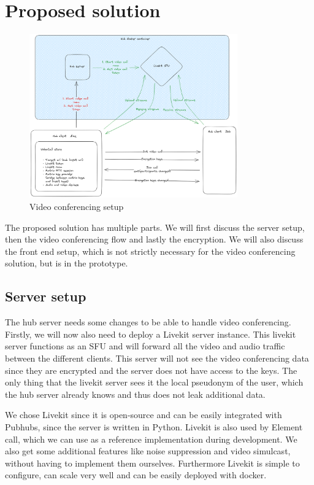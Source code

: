 \documentclass{report}
\begin{document}
\chapter{Proposed solution}
\begin{figure}[!hbt]
\centering
\includegraphics[width=0.8\textwidth]{img/PH_videocall.excalidraw.png}
\caption{Video conferencing setup}
\label{fig:video-conference-setup}
\end{figure}

The proposed solution has multiple parts. We will first discuss the server setup, then the video conferencing flow
and lastly the encryption. We will also discuss the front end setup, which is not strictly necessary for the video
conferencing solution, but is in the prototype.

\section{Server setup}
The hub server needs some changes to be able to handle video conferencing. Firstly, we will now also need to deploy a
Livekit server instance. This livekit server functions as an SFU and will forward all the video and audio traffic
between the different clients. This server will not see the video conferencing data since they are
encrypted and the server does not have access to the keys. The only thing that the livekit server sees it the local
pseudonym of the user, which the hub server already knows and thus does not leak additional data.

We chose Livekit since it is open-source and can be easily integrated with Pubhubs, since the server is written in
Python. Livekit is also used by Element call, which we can use as a reference implementation during development. We
also get some additional features like noise suppression and video simulcast, without having to implement them
ourselves. Furthermore Livekit is simple to configure, can scale very well and can be easily deployed with docker.
\end{document}
